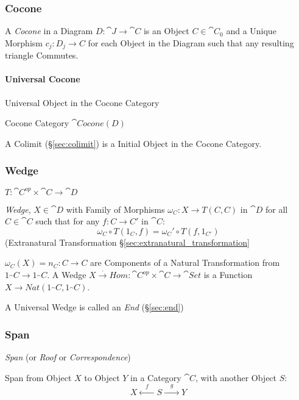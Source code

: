 \subsubsection{Cocone}\label{sec:cocone}

A \emph{Cocone} in a Diagram $D : \cat{J} \rightarrow \cat{C}$
is an Object $C \in \cat{C}_0$ and a Unique Morphism $c_j : D_j
\rightarrow C$ for each Object in the Diagram such that any resulting
triangle Commutes.




\paragraph{Universal Cocone}\label{sec:universal_cocone}\hfill

Universal Object in the Cocone Category

Cocone Category $\cat{Cocone}(D)$

A Colimit (\S\ref{sec:colimit}) is a Initial Object in the Cocone
Category.



\subsubsection{Wedge}\label{sec:wedge}

$T : \cat{C}^{op} \times \cat{C} \rightarrow \cat{D}$

\emph{Wedge}, $X \in \cat{D}$ with Family of Morphisms $\omega_C :
X \rightarrow T(C,C)$ in $\cat{D}$ for all $C \in \cat{C}$ such
that for any $f : C \rightarrow C'$ in $\cat{C}$:
\[
  \omega_C \circ T(1_C,f) = \omega_C' \circ T(f,1_{C'})
\]
(Extranatural Transformation \S\ref{sec:extranatural_transformation}

$\omega_C(X) = n_C : C \rightarrow C$ are Components of a Natural
Transformation from $1_\cat{C} \rightarrow 1_\cat{C}$. A Wedge
$X \xrightarrow{.} Hom : \cat{C}^{op} \times \cat{C} \rightarrow
\cat{Set}$ is a Function $X \rightarrow Nat
(1_\cat{C},1_\cat{C})$.

A Universal Wedge is called an \emph{End} (\S\ref{sec:end})



\subsubsection{Span}\label{sec:span}

\emph{Span} (or \emph{Roof} or \emph{Correspondence})

Span from Object $X$ to Object $Y$ in a Category $\cat{C}$, with
another Object $S$:
\[
  X \xleftarrow{\quad f \quad} S \xrightarrow{\quad g \quad} Y
\]


